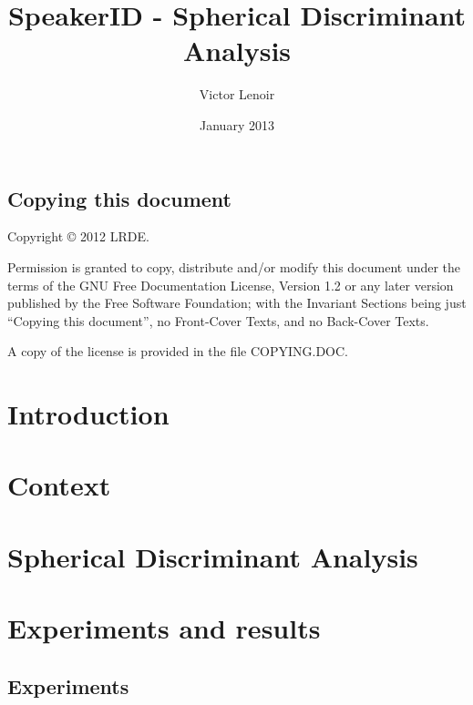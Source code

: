 \documentclass{techrep} %
\title{SpeakerID - Spherical Discriminant Analysis}
\author{Victor Lenoir} \revision$LastChangedRevision: 2340 $
\date{January 2013} \email{lenoir@lrde.epita.fr}
\begin{document}
\section*{Copying this document}
Copyright \copyright{} 2012 LRDE.

Permission is granted to copy, distribute and/or modify this document under
the terms of the GNU Free Documentation License, Version 1.2 or any later
version published by the Free Software Foundation; with the Invariant Sections
being just ``Copying this document'', no Front-Cover Texts, and no Back-Cover
Texts.

A copy of the license is provided in the file COPYING.DOC.

\tableofcontents

\newpage
\chapter*{Introduction}
\chapter{Context}
\chapter{Spherical Discriminant Analysis}
\chapter{Experiments and results}
\section{Experiments}
\end{document}
